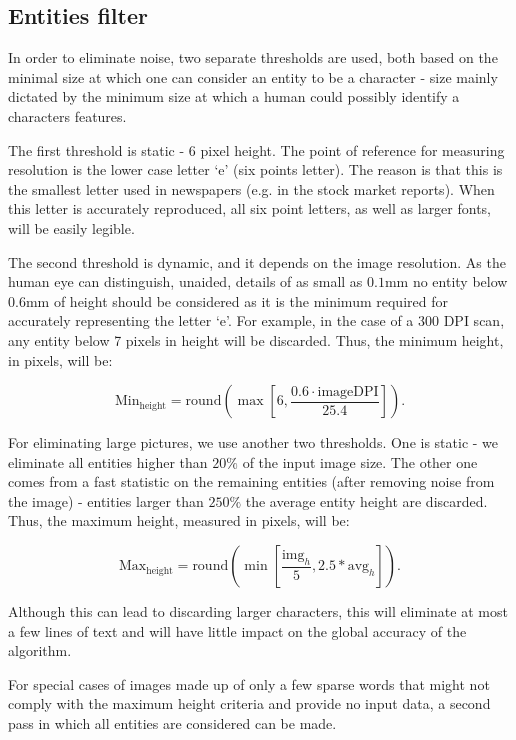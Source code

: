 \documentclass[10pt,a4paper]{article}
\begin{document}
	\subsection{Entities filter}
	In order to eliminate noise, two separate thresholds are used, both based on the minimal size at which one can consider an entity to be a character - size mainly dictated by the minimum size at which a human could possibly identify a characters features.
	
	The first threshold is static - 6 pixel height. The point of reference for measuring resolution is the lower case letter `e' (six points letter). The reason is that this is the smallest letter used in newspapers (e.g. in the stock market reports). When this letter is accurately reproduced, all six point letters, as well as larger fonts, will be easily legible.
	
	The second threshold is dynamic, and it depends on the image resolution. As the human eye can distinguish, unaided, details of as small as \(0.1\mathrm{mm}\) no entity below \(0.6\mathrm{mm}\) of height should be considered as it is the minimum required for accurately representing the letter `e'. For example, in the case of a 300 DPI scan, any entity below 7 pixels in height will be discarded. Thus, the minimum height, in pixels, will be:
	
	\[
	\text{Min}_{\text{height}} = \text{round}\left(\max\left[6,\frac{0.6\cdot \text{imageDPI}}{25.4}\right]\right).
	\tag{1}
	\]
	
	For eliminating large pictures, we use another two thresholds. One is static - we eliminate all entities higher than \(20\%\) of the input image size. The other one comes from a fast statistic on the remaining entities (after removing noise from the image) - entities larger than \(250\%\) the average entity height are discarded. Thus, the maximum height, measured in pixels, will be:
	
	\[
	\text{Max}_{\text{height}} = \text{round}\left(\min\left[\frac{\text{img}_h}{5},2.5*\text{avg}_h\right]\right).
	\tag{2}
	\]
	
	Although this can lead to discarding larger characters, this will eliminate at most a few lines of text and will have little impact on the global accuracy of the algorithm.
	
	For special cases of images made up of only a few sparse words that might not comply with the maximum height criteria and provide no input data, a second pass in which all entities are considered can be made.
	
\end{document}
